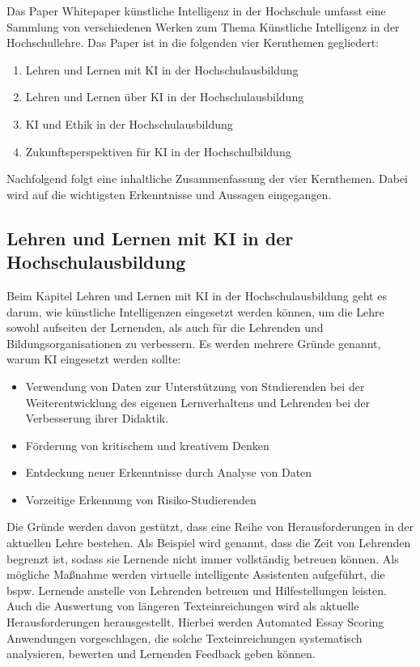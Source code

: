 
Das Paper \glqq{}Whitepaper künstliche Intelligenz in der Hochschule\grqq{} umfasst eine Sammlung von verschiedenen Werken zum Thema Künstliche Intelligenz in der Hochschullehre. Das Paper ist in die folgenden vier Kernthemen gegliedert:
\begin{enumerate}
    \item Lehren und Lernen mit KI in der Hochschulausbildung
    \item Lehren und Lernen über KI in der Hochschulausbildung
    \item KI und Ethik in der Hochschulausbildung
    \item Zukunftsperspektiven für KI in der Hochschulbildung
\end{enumerate}

Nachfolgend folgt eine inhaltliche Zusammenfassung der vier Kernthemen. Dabei wird auf die wichtigsten Erkenntnisse und Aussagen eingegangen.


\subsection{Lehren und Lernen mit KI in der Hochschulausbildung}
Beim Kapitel \glqq{}Lehren und Lernen mit KI in der Hochschulausbildung\grqq{} geht es darum, wie künstliche Intelligenzen eingesetzt werden können, um die Lehre sowohl aufseiten der Lernenden, als auch für die Lehrenden und Bildungsorganisationen zu verbessern. Es werden mehrere Gründe genannt, warum KI eingesetzt werden sollte:
\begin{itemize}
    \item Verwendung von Daten zur Unterstützung von Studierenden bei der Weiterentwicklung des eigenen Lernverhaltens und Lehrenden bei der Verbesserung ihrer Didaktik.
    \item Förderung von kritischem und kreativem Denken
    \item Entdeckung neuer Erkenntnisse durch Analyse von Daten
    \item Vorzeitige Erkennung von Risiko-Studierenden
\end{itemize} \cite*[S. 11f.]{Witt.2020}

Die Gründe werden davon gestützt, dass eine Reihe von Herausforderungen in der aktuellen Lehre bestehen. Als Beispiel wird genannt, dass die Zeit von Lehrenden begrenzt ist, sodass sie Lernende nicht immer vollständig betreuen können. Als mögliche Maßnahme werden virtuelle intelligente Assistenten aufgeführt, die bspw. Lernende anstelle von Lehrenden betreuen und Hilfestellungen leisten. Auch die Auswertung von längeren Texteinreichungen wird als aktuelle Herausforderungen herausgestellt. Hierbei werden Automated Essay Scoring Anwendungen vorgeschlagen, die solche Texteinreichungen systematisch analysieren, bewerten und Lernenden Feedback geben können. \cite*[S. 12]{Witt.2020}

